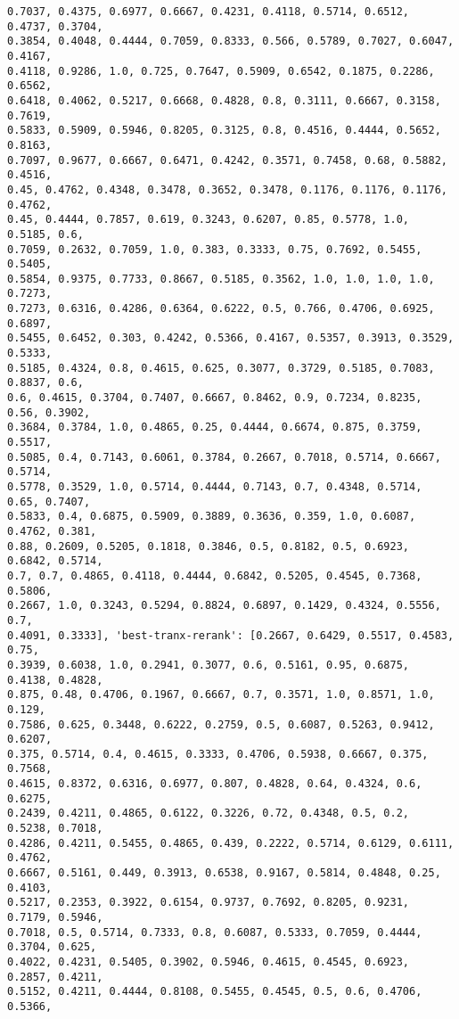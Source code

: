 \documentclass[11pt]{article}
\begin{document}
\begin{Verbatim}[commandchars=\\\{\}]
0.7037, 0.4375, 0.6977, 0.6667, 0.4231, 0.4118, 0.5714, 0.6512, 0.4737, 0.3704,
0.3854, 0.4048, 0.4444, 0.7059, 0.8333, 0.566, 0.5789, 0.7027, 0.6047, 0.4167,
0.4118, 0.9286, 1.0, 0.725, 0.7647, 0.5909, 0.6542, 0.1875, 0.2286, 0.6562,
0.6418, 0.4062, 0.5217, 0.6668, 0.4828, 0.8, 0.3111, 0.6667, 0.3158, 0.7619,
0.5833, 0.5909, 0.5946, 0.8205, 0.3125, 0.8, 0.4516, 0.4444, 0.5652, 0.8163,
0.7097, 0.9677, 0.6667, 0.6471, 0.4242, 0.3571, 0.7458, 0.68, 0.5882, 0.4516,
0.45, 0.4762, 0.4348, 0.3478, 0.3652, 0.3478, 0.1176, 0.1176, 0.1176, 0.4762,
0.45, 0.4444, 0.7857, 0.619, 0.3243, 0.6207, 0.85, 0.5778, 1.0, 0.5185, 0.6,
0.7059, 0.2632, 0.7059, 1.0, 0.383, 0.3333, 0.75, 0.7692, 0.5455, 0.5405,
0.5854, 0.9375, 0.7733, 0.8667, 0.5185, 0.3562, 1.0, 1.0, 1.0, 1.0, 0.7273,
0.7273, 0.6316, 0.4286, 0.6364, 0.6222, 0.5, 0.766, 0.4706, 0.6925, 0.6897,
0.5455, 0.6452, 0.303, 0.4242, 0.5366, 0.4167, 0.5357, 0.3913, 0.3529, 0.5333,
0.5185, 0.4324, 0.8, 0.4615, 0.625, 0.3077, 0.3729, 0.5185, 0.7083, 0.8837, 0.6,
0.6, 0.4615, 0.3704, 0.7407, 0.6667, 0.8462, 0.9, 0.7234, 0.8235, 0.56, 0.3902,
0.3684, 0.3784, 1.0, 0.4865, 0.25, 0.4444, 0.6674, 0.875, 0.3759, 0.5517,
0.5085, 0.4, 0.7143, 0.6061, 0.3784, 0.2667, 0.7018, 0.5714, 0.6667, 0.5714,
0.5778, 0.3529, 1.0, 0.5714, 0.4444, 0.7143, 0.7, 0.4348, 0.5714, 0.65, 0.7407,
0.5833, 0.4, 0.6875, 0.5909, 0.3889, 0.3636, 0.359, 1.0, 0.6087, 0.4762, 0.381,
0.88, 0.2609, 0.5205, 0.1818, 0.3846, 0.5, 0.8182, 0.5, 0.6923, 0.6842, 0.5714,
0.7, 0.7, 0.4865, 0.4118, 0.4444, 0.6842, 0.5205, 0.4545, 0.7368, 0.5806,
0.2667, 1.0, 0.3243, 0.5294, 0.8824, 0.6897, 0.1429, 0.4324, 0.5556, 0.7,
0.4091, 0.3333], 'best-tranx-rerank': [0.2667, 0.6429, 0.5517, 0.4583, 0.75,
0.3939, 0.6038, 1.0, 0.2941, 0.3077, 0.6, 0.5161, 0.95, 0.6875, 0.4138, 0.4828,
0.875, 0.48, 0.4706, 0.1967, 0.6667, 0.7, 0.3571, 1.0, 0.8571, 1.0, 0.129,
0.7586, 0.625, 0.3448, 0.6222, 0.2759, 0.5, 0.6087, 0.5263, 0.9412, 0.6207,
0.375, 0.5714, 0.4, 0.4615, 0.3333, 0.4706, 0.5938, 0.6667, 0.375, 0.7568,
0.4615, 0.8372, 0.6316, 0.6977, 0.807, 0.4828, 0.64, 0.4324, 0.6, 0.6275,
0.2439, 0.4211, 0.4865, 0.6122, 0.3226, 0.72, 0.4348, 0.5, 0.2, 0.5238, 0.7018,
0.4286, 0.4211, 0.5455, 0.4865, 0.439, 0.2222, 0.5714, 0.6129, 0.6111, 0.4762,
0.6667, 0.5161, 0.449, 0.3913, 0.6538, 0.9167, 0.5814, 0.4848, 0.25, 0.4103,
0.5217, 0.2353, 0.3922, 0.6154, 0.9737, 0.7692, 0.8205, 0.9231, 0.7179, 0.5946,
0.7018, 0.5, 0.5714, 0.7333, 0.8, 0.6087, 0.5333, 0.7059, 0.4444, 0.3704, 0.625,
0.4022, 0.4231, 0.5405, 0.3902, 0.5946, 0.4615, 0.4545, 0.6923, 0.2857, 0.4211,
0.5152, 0.4211, 0.4444, 0.8108, 0.5455, 0.4545, 0.5, 0.6, 0.4706, 0.5366,

\end{Verbatim}
\end{document}
